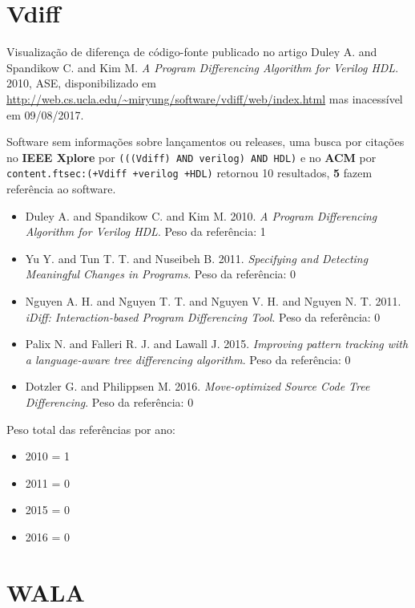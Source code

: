 \section{Vdiff}

Visualização de diferença de código-fonte
publicado no artigo
Duley A. and Spandikow C. and Kim M.
{\it A Program Differencing Algorithm for Verilog HDL}.
2010,
ASE,
disponibilizado em \url{http://web.cs.ucla.edu/~miryung/software/vdiff/web/index.html}
mas inacessível em 09/08/2017.

Software sem informações sobre lançamentos ou releases,
uma busca por citações no {\bf IEEE Xplore} por
\texttt{(((Vdiff) AND verilog) AND HDL)}
e no {\bf ACM} por
\texttt{content.ftsec:(+Vdiff +verilog +HDL)}
retornou
10 resultados,
{\bf 5} fazem referência ao software.

\begin{itemize}
\item Duley A. and Spandikow C. and Kim M.
      2010.
      {\it A Program Differencing Algorithm for Verilog HDL}.
      Peso da referência: 1
\item Yu Y. and Tun T. T. and Nuseibeh B.
      2011.
      {\it Specifying and Detecting Meaningful Changes in Programs}.
      Peso da referência: 0
\item Nguyen A. H. and Nguyen T. T. and Nguyen V. H. and Nguyen N. T.
      2011.
      {\it iDiff: Interaction-based Program Differencing Tool}.
      Peso da referência: 0
\item Palix N. and Falleri R. J. and Lawall J.
      2015.
      {\it Improving pattern tracking with a language-aware tree differencing algorithm}.
      Peso da referência: 0
\item Dotzler G. and Philippsen M.
      2016.
      {\it Move-optimized Source Code Tree Differencing}.
      Peso da referência: 0
\end{itemize}

Peso total das referências por ano:

\begin{itemize}
\item 2010 = 1
\item 2011 = 0
\item 2015 = 0
\item 2016 = 0
\end{itemize}


\section{WALA}

